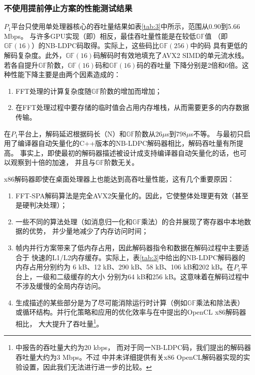 \documentclass{cjc}
\begin{document}
\subsubsection{不使用提前停止方案的性能测试结果}

  $P_1$平台只使用单处理器核心的吞吐量结果如表\ref{tab:3}中所示，范围从0.90到5.66 Mbps。
  与许多GPU实现（即\cite{noauthor_andrade_nodate}）相反，最佳吞吐量性能是在较低$\mathbb{GF}$值
  （即$\mathbb{GF}(16)$）的NB-LDPC码取得。实际上，这些码比$\mathbb{GF}(256)$中的码
  具有更低的解码复杂度。此外，$\mathbb{GF}(16)$码解码时有效地填充了AVX2 SIMD的单元流水线。
  若各自提升$\mathbb{GF}$阶数，$\mathbb{GF}(16)$码和$\mathbb{GF}(16)$码的吞吐量
  下降分别是2倍和6倍。这种性能下降主要是由两个因素造成的：
\begin{enumerate}
  \item FFT处理的计算复杂度随$\mathbb{GF}$阶数的增加而增加；
  \item 在FFT处理过程中要存储的临时值会占用内存堆栈，从而需要更多的内存数据传输。
\end{enumerate}

  在$P_1$平台上，解码延迟根据码长（N）和$\mathbb{GF}$阶数从26$\mu$s到798$\mu$s不等。
  与最初只启用了编译器自动矢量化的C++版本的NB-LDPC解码器相比，解码吞吐量有所提高。
  事实上，即使最初的解码器描述被设计成支持编译器自动矢量化的话，也可以观察到十倍的加速，
  并且与$\mathbb{GF}$阶数无关。
  
  x86解码器即使在桌面处理器上也能达到高吞吐量性能，这有几个重要原因：
  \begin{enumerate}
    \item FFT-SPA解码算法是完全AVX2矢量化的。因此，它使整体处理更有效（甚至是硬判决处理）；
    \item 一些不同的算法处理（如消息归一化和$\mathbb{GF}$乘法）的合并展现了寄存器中本地数据的优势，
    并少量地减少了内存访问时间；
    \item 帧内并行方案带来了低内存占用，因此解码器指令和数据在解码过程中主要适合于
    快速的L1/L2内存缓存。实际上，表\ref{tab:3}中给出的NB-LDPC解码器的内存占用分别约为
    6 kB、12 kB、290 kB、58 kB、106 kB和202 kB。在$P_1$平台上，一级和二级缓存的大小
    分别为64 kB和256 kB。这意味着在解码过程中不涉及缓慢的全局内存访问。
    \item 生成描述的某些部分是为了尽可能消除运行时计算（例如$\mathbb{GF}$乘法和除法表）
    或循环结构。并行化策略和应用的优化效率与在\cite{noauthor_wang_nodate}中提出的OpenCL x86解码器相比，
    大大提升了吞吐量\footnote{\cite{noauthor_wang_nodate}中报告的吞吐量大约为20 kbps，
    而对于同一NB-LDPC码，我们提出的解码器吞吐量大约为3 Mbps。不过\cite{noauthor_wang_nodate}
    中并未详细提供有关x86 OpenCL解码器实现的实验设置，因此我们无法进行进一步的比较。}。
  \end{enumerate}
\end{document}
